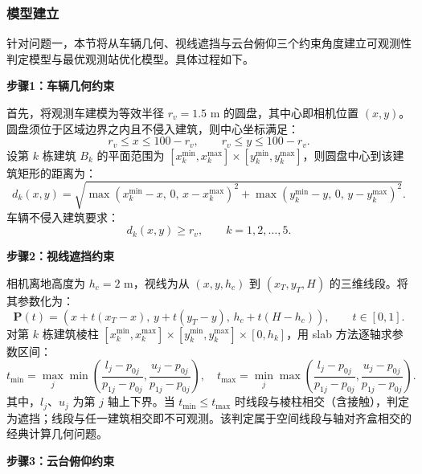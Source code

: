 
\subsubsection{模型建立}

针对问题一，本节将从车辆几何、视线遮挡与云台俯仰三个约束角度建立可观测性判定模型与最优观测站优化模型。具体过程如下。

\textbf{步骤1：车辆几何约束}

首先，将观测车建模为等效半径 $r_v=1.5$ m 的圆盘，其中心即相机位置 $(x,y)$。圆盘须位于区域边界之内且不侵入建筑，则中心坐标满足：
\begin{equation}
    r_v \le x \le 100 - r_v, \qquad r_v \le y \le 100 - r_v .
\end{equation}
设第 $k$ 栋建筑 $B_k$ 的平面范围为 $[x_k^{\min},x_k^{\max}]\times[y_k^{\min},y_k^{\max}]$，则圆盘中心到该建筑矩形的距离为：
\begin{equation}
    d_k(x,y)=\sqrt{\max(x_k^{\min}-x,\,0,\,x-x_k^{\max})^2+\max(y_k^{\min}-y,\,0,\,y-y_k^{\max})^2}.
\end{equation}
车辆不侵入建筑要求：
\begin{equation}
    d_k(x,y) \ge r_v, \qquad k=1,2,\dots,5 .
\end{equation}

\textbf{步骤2：视线遮挡约束}

相机离地高度为 $h_c=2$ m，视线为从 $(x,y,h_c)$ 到 $(x_T,y_T,H)$ 的三维线段。将其参数化为：
\begin{equation}
    \bm{P}(t)=(x+t(x_T-x),\, y+t(y_T-y),\, h_c+t(H-h_c)), \qquad t\in[0,1] .
\end{equation}
对第 $k$ 栋建筑棱柱 $[x_k^{\min},x_k^{\max}]\times[y_k^{\min},y_k^{\max}]\times[0,h_k]$，用 slab 方法逐轴求参数区间：
\begin{equation}
    t_{\min}=\max_{j}\min\!\left(\frac{l_j-p_{0j}}{p_{1j}-p_{0j}},\frac{u_j-p_{0j}}{p_{1j}-p_{0j}}\right), \quad
    t_{\max}=\min_{j}\max\!\left(\frac{l_j-p_{0j}}{p_{1j}-p_{0j}},\frac{u_j-p_{0j}}{p_{1j}-p_{0j}}\right).
\end{equation}
其中，$l_j$、$u_j$ 为第 $j$ 轴上下界。当 $t_{\min}\le t_{\max}$ 时线段与棱柱相交（含接触），判定为遮挡；线段与任一建筑相交即不可观测。该判定属于空间线段与轴对齐盒相交的经典计算几何问题\cite{zhang2004juzhen}。

\textbf{步骤3：云台俯仰约束}

